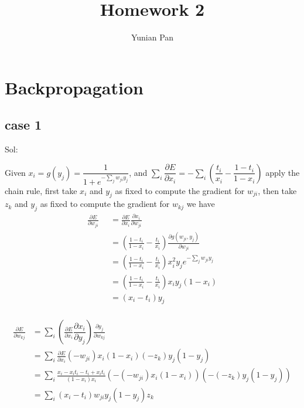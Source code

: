 \documentclass[a4paper,12pt]{article}
\begin{document}
\title{\textbf{Homework 2}}
\author{Yunian Pan}
\maketitle{}


\section{Backpropagation}

\subsection{case 1}

Sol: 

Given $x_i = g(y_j) = \dfrac{1}{1+e^{-\sum_j {w_{ji}y_j}}}$, and $\sum_{i}\dfrac{\partial E}{\partial x_i} = -\sum_i {(\dfrac{t_i}{x_i} - \dfrac{1 - t_i}{1 - x_i})}$ apply the chain rule, first take $x_i$ and $y_j$ as fixed to compute the gradient for $w_{ji}$, then take $z_k$ and $y_j$ as fixed to compute the gradient for $w_{kj}$ we have 
\begin{align}
\frac{\partial E}{\partial w_{ji}} & = \frac{\partial E}{\partial x_i}\frac{\partial x_i}{\partial w_{ji}}\nonumber \\
&= (\frac{1-t_i}{1- x_i} - \frac{t_i}{x_i})\frac{\partial g(w_{ji}, y_j) }{\partial w_{ji}} \nonumber \\
& = (\frac{1-t_i}{1- x_i} - \frac{t_i}{x_i}) x^2_i y_{j} e^{-\sum_j{w_{ji}y_j}} \nonumber \\
& = (\frac{1-t_i}{1- x_i} - \frac{t_i}{x_i}) x_i y_{j} (1-x_i) \nonumber \\
& = (x_i - t_i) y_j \nonumber \\
\qquad \nonumber 
\end{align}

\begin{align}
\frac{\partial E}{\partial w_{kj}} & =  \sum_{i} (\frac{\partial E}{\partial x_i}  \dfrac{\partial x_i}{\partial y_j} )\frac{\partial y_j}{\partial w_{kj}} \nonumber \\
& =  \sum_{i} \frac{\partial E}{\partial x_i}(-w_{ji}) x_i (1 - x_i) (-z_k) y_j(1- y_j)\nonumber  \\
& = \sum_{i} \frac{x_i - x_i t_i - t_i + x_i t_i}{ (1-x_i)x_i } (-(-w_{ji}) x_i (1 - x_i))(- (-z_k) y_j(1- y_j)) \nonumber \\
& = \sum_{i} (x_i - t_i) w_{ji} y_j(1- y_j) z_k \nonumber 
\end{align}
\end{document}
